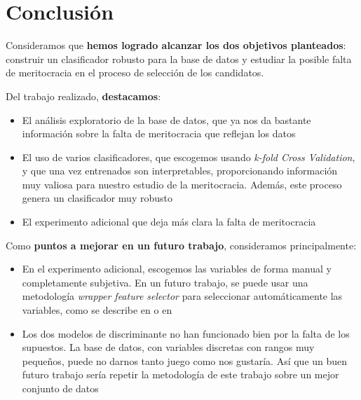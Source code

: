 \section{Conclusión}

Consideramos que \textbf{hemos logrado alcanzar los dos objetivos planteados}: construir un clasificador robusto para la base de datos y estudiar la posible falta de meritocracia en el proceso de selección de los candidatos.

Del trabajo realizado, \textbf{destacamos}:

\begin{itemize}
    \item El análisis exploratorio de la base de datos, que ya nos da bastante información sobre la falta de meritocracia que reflejan los datos
    \item El uso de varios clasificadores, que escogemos usando \textit{k-fold Cross Validation}, y que una vez entrenados son interpretables, proporcionando información muy valiosa para nuestro estudio de la meritocracia. Además, este proceso genera un clasificador muy robusto
    \item El experimento adicional que deja más clara la falta de meritocracia
\end{itemize}

Como \textbf{puntos a mejorar en un futuro trabajo}, consideramos principalmente:

\begin{itemize}
    \item En el experimento adicional, escogemos las variables de forma manual y completamente subjetiva. En un futuro trabajo, se puede usar una metodología \textit{wrapper feature selector} para seleccionar automáticamente las variables, como se describe en \cite{r_wrap:online} o en \cite{general_wrap:online}
    \item Los dos modelos de discriminante no han funcionado bien por la falta de los supuestos. La base de datos, con variables discretas con rangos muy pequeños, puede no darnos tanto juego como nos gustaría. Así que un buen futuro trabajo sería repetir la metodología de este trabajo sobre un mejor conjunto de datos
\end{itemize}




